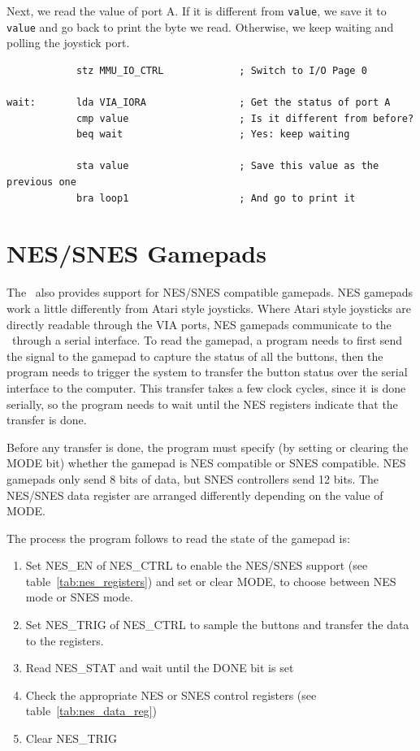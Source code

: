 Next, we read the value of port A. If it is different from \verb+value+, we save it to \verb+value+ and go back to print the byte we read. Otherwise, we keep waiting and polling the joystick port.

\begin{verbatim}
            stz MMU_IO_CTRL             ; Switch to I/O Page 0

wait:       lda VIA_IORA                ; Get the status of port A
            cmp value                   ; Is it different from before?
            beq wait                    ; Yes: keep waiting

            sta value                   ; Save this value as the previous one
            bra loop1                   ; And go to print it
\end{verbatim}

\section*{NES/SNES Gamepads}

The \jr\ also provides support for NES/SNES compatible gamepads. NES gamepads work a little differently from Atari style joysticks. Where Atari style joysticks are directly readable through the VIA ports, NES gamepads communicate to the \jr\ through a serial interface. To read the gamepad, a program needs to first send the signal to the gamepad to capture the status of all the buttons, then the program needs to trigger the system to transfer the button status over the serial interface to the computer. This transfer takes a few clock cycles, since it is done serially, so the program needs to wait until the NES registers indicate that the transfer is done.

Before any transfer is done, the program must specify (by setting or clearing the MODE bit) whether the gamepad is NES compatible or SNES compatible. NES gamepads only send 8 bits of data, but SNES controllers send 12 bits. The NES/SNES data register are arranged differently depending on the value of MODE.

The process the program follows to read the state of the gamepad is:

\begin{enumerate}
    \item Set NES\_EN of NES\_CTRL to enable the NES/SNES support (see table~\ref{tab:nes_registers}) and set or clear MODE, to choose between NES mode or SNES mode.
    \item Set NES\_TRIG of NES\_CTRL to sample the buttons and transfer the data to the registers.
    \item Read NES\_STAT and wait until the DONE bit is set
    \item Check the appropriate NES or SNES control registers (see table~\ref{tab:nes_data_reg})
    \item Clear NES\_TRIG
\end{enumerate}

